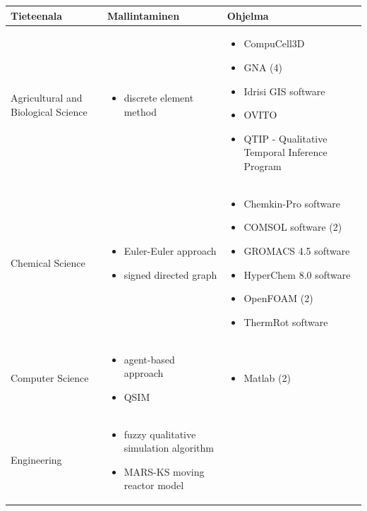 \documentclass[utf8]{gradu3}
\begin{document}
\begin{longtable}[h]{|p{4cm}|p{6cm}|p{5cm}|}
    \hline
    \textbf{Tieteenala}    &    \textbf{Mallintaminen}  &  \textbf{Ohjelma}\\
    \hline
    Agricultural and Biological Science & 
    \begin{itemize}
        \item discrete element method
    \end{itemize} &
    \begin{itemize}
        \item CompuCell3D
        \item GNA (4)
        \item Idrisi GIS software
        \item OVITO
        \item QTIP - Qualitative Temporal Inference Program
    \end{itemize} 
    \\
    \hline
    Chemical Science & \begin{itemize}
        \item Euler-Euler approach
        \item signed directed graph
    \end{itemize} &
    \begin{itemize}
        \item Chemkin-Pro software
        \item COMSOL software (2)
        \item GROMACS 4.5 software
        \item HyperChem 8.0 software
        \item OpenFOAM (2)
        \item ThermRot software
    \end{itemize} 
    \\
    \hline
    Computer Science & \begin{itemize}
        \item agent-based approach
        \item QSIM
    \end{itemize} &
    \begin{itemize}
        \item Matlab (2)
    \end{itemize} 
    \\
    \hline
    Engineering & \begin{itemize}
        \item fuzzy qualitative simulation algorithm
        \item MARS-KS moving reactor model

\end{itemize}
\end{longtable}
\end{document}
